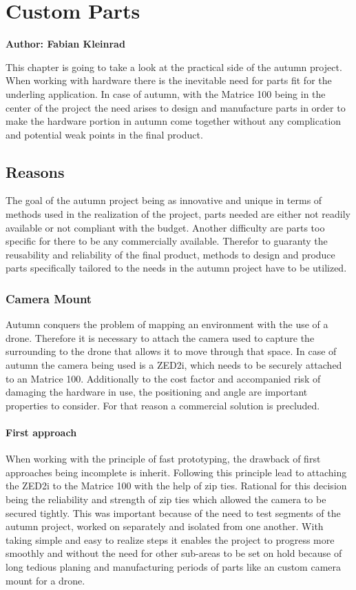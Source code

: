 \chapter{Custom Parts}

\textbf{Author: Fabian Kleinrad} 

This chapter is going to take a look at the practical side of the autumn project. When working with hardware there is the inevitable need for parts fit for the underling application. In case of autumn, with the Matrice 100 being in the center of the project the need arises to design and manufacture parts in order to make the hardware portion in autumn come together without any complication and potential weak points in the final product.

\section{Reasons}

The goal of the autumn project being as innovative and unique in terms of methods used in the realization of the project, parts needed are either not readily available or not compliant with the budget. Another difficulty are parts too specific for there to be any commercially available. Therefor to guaranty the reusability and reliability of the final product, methods to design and produce parts specifically tailored to the needs in the autumn project have to be utilized.

\subsection{Camera Mount}

Autumn conquers the problem of mapping an environment with the use of a drone. Therefore it is necessary to attach the camera used to capture the surrounding to the drone that allows it to move through that space. In case of autumn the camera being used is a ZED2i, which needs to be securely attached to an Matrice 100. Additionally to the cost factor and accompanied risk of damaging the hardware in use, the positioning and angle are important properties to consider. For that reason a commercial solution is precluded.

\subsubsection{First approach}

When working with the principle of fast prototyping, the drawback of first approaches being incomplete is inherit. Following this principle lead to attaching the ZED2i to the Matrice 100 with the help of zip ties. Rational for this decision being the reliability and strength of zip ties which allowed the camera to be secured tightly. This was important because of the need to test segments of the autumn project, worked on separately and isolated from one another. With taking simple and easy to realize steps it enables the project to progress more smoothly and without the need for other sub-areas to be set on hold because of long tedious planing and manufacturing periods of parts like an custom camera mount for a drone.

